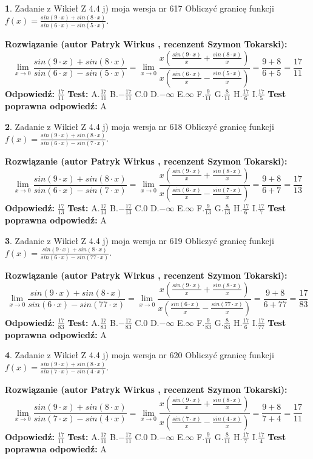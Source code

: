 \documentclass[12pt, a4paper]{article}
\theoremstyle{definition} %
\newtheorem{zad}{}
\newcommand{\zadStart}[1]{\begin{zad}#1\newline}
\newcommand{\zadStop}{\end{zad}}
\newcommand{\rozwStart}[2]{\noindent \textbf{Rozwiązanie (autor #1 , recenzent #2): }\newline}
\newcommand{\rozwStop}{\newline}
\newcommand{\odpStart}{\noindent \textbf{Odpowiedź:}\newline}
\newcommand{\odpStop}{\newline}
\newcommand{\testStart}{\noindent \textbf{Test:}\newline}
\newcommand{\testStop}{\newline}
\newcommand{\kluczStart}{\noindent \textbf{Test poprawna odpowiedź:}\newline}
\newcommand{\kluczStop}{\newline}
\begin{document}
\zadStart{Zadanie z Wikieł Z 4.4 j) moja wersja nr 617}
Obliczyć granicę funkcji $f(x)=\frac{sin(9\cdot x) +sin(8\cdot x)}{sin(6\cdot x) -sin(5\cdot x)}$.
\zadStop
\rozwStart{Patryk Wirkus}{Szymon Tokarski}
$$\lim\limits_{x\to 0}\frac{sin(9\cdot x) +sin(8\cdot x)}{sin(6\cdot x) -sin(5\cdot x)}=\lim\limits_{x\to 0}\frac{x(\frac{sin(9\cdot x)}{x}+\frac{sin(8\cdot x)}{x})}{x(\frac{sin(6\cdot x)}{x}-\frac{sin(5\cdot x)}{x})}=\frac{9+8}{6+5} = \frac{17}{11}$$
\rozwStop
\odpStart
$\frac{17}{11}$
\odpStop
\testStart
A.$\frac{17}{11}$
B.$-\frac{17}{11}$
C.$0$
D.$-\infty$
E.$\infty$
F.$\frac{9}{11}$
G.$\frac{8}{11}$
H.$\frac{17}{6}$
I.$\frac{17}{5}$
\testStop
\kluczStart
A
\kluczStop



\zadStart{Zadanie z Wikieł Z 4.4 j) moja wersja nr 618}
Obliczyć granicę funkcji $f(x)=\frac{sin(9\cdot x) +sin(8\cdot x)}{sin(6\cdot x) -sin(7\cdot x)}$.
\zadStop
\rozwStart{Patryk Wirkus}{Szymon Tokarski}
$$\lim\limits_{x\to 0}\frac{sin(9\cdot x) +sin(8\cdot x)}{sin(6\cdot x) -sin(7\cdot x)}=\lim\limits_{x\to 0}\frac{x(\frac{sin(9\cdot x)}{x}+\frac{sin(8\cdot x)}{x})}{x(\frac{sin(6\cdot x)}{x}-\frac{sin(7\cdot x)}{x})}=\frac{9+8}{6+7} = \frac{17}{13}$$
\rozwStop
\odpStart
$\frac{17}{13}$
\odpStop
\testStart
A.$\frac{17}{13}$
B.$-\frac{17}{13}$
C.$0$
D.$-\infty$
E.$\infty$
F.$\frac{9}{13}$
G.$\frac{8}{13}$
H.$\frac{17}{6}$
I.$\frac{17}{7}$
\testStop
\kluczStart
A
\kluczStop



\zadStart{Zadanie z Wikieł Z 4.4 j) moja wersja nr 619}
Obliczyć granicę funkcji $f(x)=\frac{sin(9\cdot x) +sin(8\cdot x)}{sin(6\cdot x) -sin(77\cdot x)}$.
\zadStop
\rozwStart{Patryk Wirkus}{Szymon Tokarski}
$$\lim\limits_{x\to 0}\frac{sin(9\cdot x) +sin(8\cdot x)}{sin(6\cdot x) -sin(77\cdot x)}=\lim\limits_{x\to 0}\frac{x(\frac{sin(9\cdot x)}{x}+\frac{sin(8\cdot x)}{x})}{x(\frac{sin(6\cdot x)}{x}-\frac{sin(77\cdot x)}{x})}=\frac{9+8}{6+77} = \frac{17}{83}$$
\rozwStop
\odpStart
$\frac{17}{83}$
\odpStop
\testStart
A.$\frac{17}{83}$
B.$-\frac{17}{83}$
C.$0$
D.$-\infty$
E.$\infty$
F.$\frac{9}{83}$
G.$\frac{8}{83}$
H.$\frac{17}{6}$
I.$\frac{17}{77}$
\testStop
\kluczStart
A
\kluczStop



\zadStart{Zadanie z Wikieł Z 4.4 j) moja wersja nr 620}
Obliczyć granicę funkcji $f(x)=\frac{sin(9\cdot x) +sin(8\cdot x)}{sin(7\cdot x) -sin(4\cdot x)}$.
\zadStop
\rozwStart{Patryk Wirkus}{Szymon Tokarski}
$$\lim\limits_{x\to 0}\frac{sin(9\cdot x) +sin(8\cdot x)}{sin(7\cdot x) -sin(4\cdot x)}=\lim\limits_{x\to 0}\frac{x(\frac{sin(9\cdot x)}{x}+\frac{sin(8\cdot x)}{x})}{x(\frac{sin(7\cdot x)}{x}-\frac{sin(4\cdot x)}{x})}=\frac{9+8}{7+4} = \frac{17}{11}$$
\rozwStop
\odpStart
$\frac{17}{11}$
\odpStop
\testStart
A.$\frac{17}{11}$
B.$-\frac{17}{11}$
C.$0$
D.$-\infty$
E.$\infty$
F.$\frac{9}{11}$
G.$\frac{8}{11}$
H.$\frac{17}{7}$
I.$\frac{17}{4}$
\testStop
\kluczStart
A
\kluczStop
\end{document}
